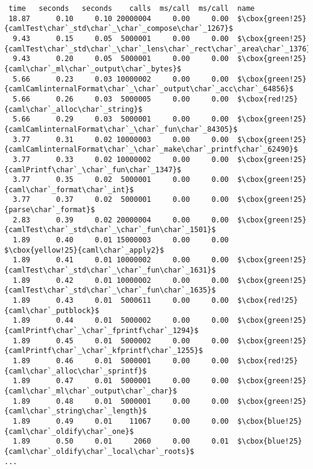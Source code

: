 \begin{lstlisting}[basicstyle=\linespread{0.8}\ttfamily\footnotesize,
basewidth={.4em,.2em}, frame=single]
  %   cumulative   self              self     total           
 time   seconds   seconds    calls  ms/call  ms/call  name    
 18.87      0.10     0.10 20000004     0.00     0.00  $\cbox{green!25}{camlTest\char`_std\char`_\char`_compose\char`_1267}$
  9.43      0.15     0.05  5000001     0.00     0.00  $\cbox{green!25}{camlTest\char`_std\char`_\char`_lens\char`_rect\char`_area\char`_1376}$
  9.43      0.20     0.05  5000001     0.00     0.00  $\cbox{green!25}{caml\char`_ml\char`_output\char`_bytes}$
  5.66      0.23     0.03 10000002     0.00     0.00  $\cbox{green!25}{camlCamlinternalFormat\char`_\char`_output\char`_acc\char`_64856}$
  5.66      0.26     0.03  5000005     0.00     0.00  $\cbox{red!25}{caml\char`_alloc\char`_string}$
  5.66      0.29     0.03  5000001     0.00     0.00  $\cbox{green!25}{camlCamlinternalFormat\char`_\char`_fun\char`_84305}$
  3.77      0.31     0.02 10000003     0.00     0.00  $\cbox{green!25}{camlCamlinternalFormat\char`_\char`_make\char`_printf\char`_62490}$
  3.77      0.33     0.02 10000002     0.00     0.00  $\cbox{green!25}{camlPrintf\char`_\char`_fun\char`_1347}$
  3.77      0.35     0.02  5000001     0.00     0.00  $\cbox{green!25}{caml\char`_format\char`_int}$
  3.77      0.37     0.02  5000001     0.00     0.00  $\cbox{green!25}{parse\char`_format}$
  2.83      0.39     0.02 20000004     0.00     0.00  $\cbox{green!25}{camlTest\char`_std\char`_\char`_fun\char`_1501}$
  1.89      0.40     0.01 15000003     0.00     0.00  $\cbox{yellow!25}{caml\char`_apply2}$
  1.89      0.41     0.01 10000002     0.00     0.00  $\cbox{green!25}{camlTest\char`_std\char`_\char`_fun\char`_1631}$
  1.89      0.42     0.01 10000002     0.00     0.00  $\cbox{green!25}{camlTest\char`_std\char`_\char`_fun\char`_1635}$
  1.89      0.43     0.01  5000611     0.00     0.00  $\cbox{red!25}{caml\char`_putblock}$
  1.89      0.44     0.01  5000002     0.00     0.00  $\cbox{green!25}{camlPrintf\char`_\char`_fprintf\char`_1294}$
  1.89      0.45     0.01  5000002     0.00     0.00  $\cbox{green!25}{camlPrintf\char`_\char`_kfprintf\char`_1255}$
  1.89      0.46     0.01  5000001     0.00     0.00  $\cbox{red!25}{caml\char`_alloc\char`_sprintf}$
  1.89      0.47     0.01  5000001     0.00     0.00  $\cbox{green!25}{caml\char`_ml\char`_output\char`_char}$
  1.89      0.48     0.01  5000001     0.00     0.00  $\cbox{green!25}{caml\char`_string\char`_length}$
  1.89      0.49     0.01    11067     0.00     0.00  $\cbox{blue!25}{caml\char`_oldify\char`_one}$
  1.89      0.50     0.01     2060     0.00     0.01  $\cbox{blue!25}{caml\char`_oldify\char`_local\char`_roots}$
...
\end{lstlisting}
